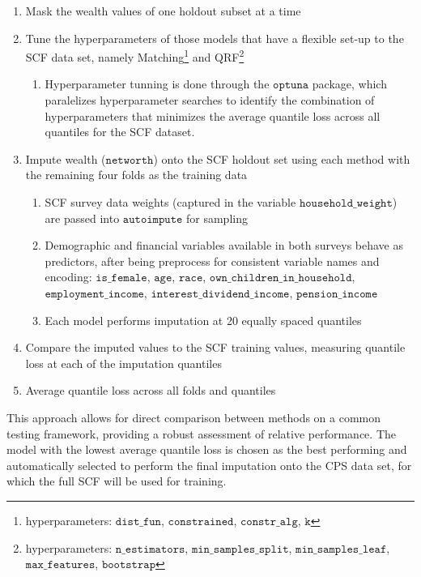 \begin{enumerate}
    \item Mask the wealth values of one holdout subset at a time

    \item Tune the hyperparameters of those models that have a flexible set-up to the SCF data set, namely Matching\footnote{hyperparameters: $\texttt{dist\_fun}$, $\texttt{constrained}$, $\texttt{constr\_alg}$, $\texttt{k}$} and QRF\footnote{hyperparameters: $\texttt{n\_estimators}$, $\texttt{min\_samples\_split}$, $\texttt{min\_samples\_leaf}$, $\texttt{max\_features}$, $\texttt{bootstrap}$}
    \begin{enumerate}
        \item Hyperparameter tunning is done through the $\texttt{optuna}$ package, which paralelizes hyperparameter searches to identify the combination of hyperparameters that minimizes the average quantile loss across all quantiles for the SCF dataset. 
    \end{enumerate}

    \item Impute wealth ($\texttt{networth}$) onto the SCF holdout set using each method with the remaining four folds as the training data
    \begin{enumerate}
        \item SCF survey data weights (captured in the variable $\texttt{household\_weight}$) are passed into $\texttt{autoimpute}$ for sampling
        \item Demographic and financial variables available in both surveys behave as predictors, after being preprocess for consistent variable names and encoding: $\texttt{is\_female}$, $\texttt{age}$, $\texttt{race}$, $\texttt{own\_children\_in\_household}$, $\texttt{employment\_income}$, $\texttt{interest\_dividend\_income}$, $\texttt{pension\_income}$ 
        \item Each model performs imputation at 20 equally spaced quantiles
    \end{enumerate}

    \item Compare the imputed values to the SCF training values, measuring quantile loss at each of the imputation quantiles 

    \item Average quantile loss across all folds and quantiles
\end{enumerate}

This approach allows for direct comparison between methods on a common testing framework, providing a robust assessment of relative performance. The model with the lowest average quantile loss is chosen as the best performing and automatically selected to perform the final imputation onto the CPS data set, for which the full SCF will be used for training. 

